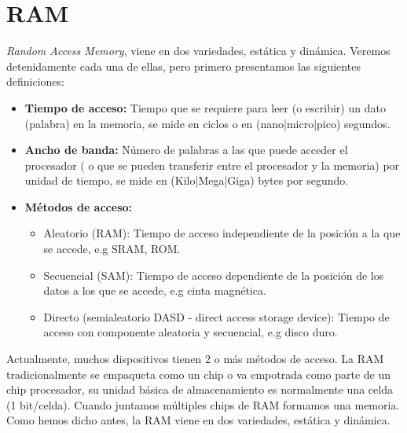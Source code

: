 \section{RAM}
\textit{Random Access Memory}, viene en dos variedades, estática
y dinámica. Veremos detenidamente cada una de ellas, pero primero presentamos las siguientes
definiciones:
\begin{itemize}
    \item \textbf{Tiempo de acceso:} Tiempo que se requiere para leer (o escribir) un dato (palabra) en la memoria, se mide en 
        ciclos o en (nano|micro|pico) segundos.
    \item \textbf{Ancho de banda:} Número de palabras a las que puede acceder el procesador ( o que se pueden transferir entre el procesador y la memoria) 
        por unidad de tiempo, se mide en (Kilo|Mega|Giga) bytes por segundo.
    \item \textbf{Métodos de acceso:}
        \begin{itemize}
            \item Aleatorio (RAM): Tiempo de acceso independiente de la posición a la que se accede, e.g SRAM, ROM.
            \item Secuencial (SAM): Tiempo de acceso dependiente de la posición de los datos a los que se accede, e.g cinta magnética.
            \item Directo (semialeatorio DASD - direct access storage device): Tiempo de acceso con componente aleatoria y secuencial, e.g disco duro.
        \end{itemize}
\end{itemize}
Actualmente, muchos dispositivos tienen 2 o más métodos de acceso.
La RAM tradicionalmente se empaqueta como un chip o va empotrada como parte
de un chip procesador, su unidad básica de almacenamiento es normalmente una celda (1 bit/celda). Cuando juntamos múltiples chips de RAM 
formamos una memoria. Como hemos dicho antes, la RAM viene en dos variedades, estática y dinámica.
